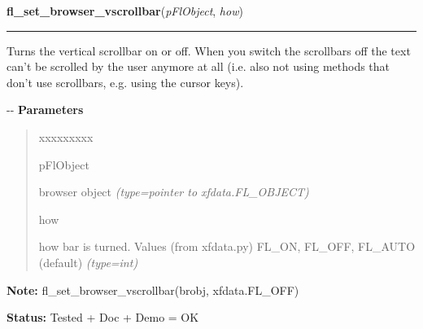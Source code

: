 \hspace{.8\funcindent}\begin{boxedminipage}{\funcwidth}

    \raggedright \textbf{fl\_set\_browser\_vscrollbar}(\textit{pFlObject}, \textit{how})

    \vspace{-1.5ex}

    \rule{\textwidth}{0.5\fboxrule}
\setlength{\parskip}{2ex}

Turns the vertical scrollbar on or off. When you switch the scrollbars
off the text can't be scrolled by the user anymore at all (i.e. also not
using methods that don't use scrollbars, e.g. using the cursor keys).

-{}-
\setlength{\parskip}{1ex}
      \textbf{Parameters}
      \vspace{-1ex}

      \begin{quote}
        \begin{Ventry}{xxxxxxxxx}

          \item[pFlObject]


browser object
            {\it (type=pointer to xfdata.FL\_OBJECT)}

          \item[how]


how bar is turned. Values (from xfdata.py) FL\_ON, FL\_OFF, FL\_AUTO
(default)
            {\it (type=int)}

        \end{Ventry}

      \end{quote}

\textbf{Note:} 
fl\_set\_browser\_vscrollbar(brobj, xfdata.FL\_OFF)


\textbf{Status:} 
Tested + Doc + Demo = OK


    \end{boxedminipage}

    \label{xformslib:flbrowser:fl_set_browser_hscrollbar}

    \vspace{0.5ex}

